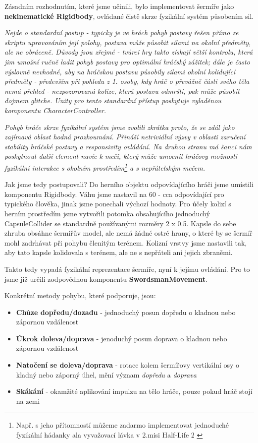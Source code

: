 Zásadním rozhodnutím, které jsme učinili, bylo implementovat šermíře jako \textbf{nekinematické Rigidbody}, ovládané čistě skrze fyzikální systém působením sil. 

\textit{Nejde o standardní postup - typicky je ve hrách pohyb postavy řešen přímo ze skriptu upravováním její polohy, postava může působit silami na okolní předměty, ale ne obráceně. Důvody jsou zřejmé - tvůrci hry takto získají větší kontrolu, která jim umožní ručně ladit pohyb postavy pro optimální hráčský zážitek; dále je často výslovně nevhodné, aby na hráčskou postavu působily silami okolní kolidující předměty - především při pohledu z 1. osoby, kdy hráč o převážně části svého těla nemá přehled - nezpozorovaná kolize, která postavu odmrští, pak může působit dojmem glitche. Unity pro tento standardní přístup poskytuje vyladěnou komponentu CharacterController.}

\textit{Pohyb hráče skrze fyzikální systém jsme zvolili zkrátka proto, že se zdál jako zajímavá oblast hodná prozkoumání. Přináší netriviální výzvy v oblasti zaručení stability hráčské postavy a responsivity ovládání. Na druhou stranu má šanci nám poskytnout další element navíc k meči, který může umocnit hráčovy možnosti fyzikální interakce s okolním prostředím\footnote{Např. s jeho přítomností můžeme zadarmo implementovat jednoduché fyzikální hádanky ala vyvažovací lávka v 2.misi Half-Life 2 \cite{HalfLife2}} a s nepřátelským mečem.}

Jak jsme tedy postupovali? Do herního objektu odpovídajícího hráči jsme umístili komponentu Rigidbody. Váhu jsme nastavil na 60 - cca odpovídající pro typického člověka, jinak jsme ponechali výchozí hodnoty. Pro účely kolizí s herním prostředím jsme vytvořili potomka obsahujícího jednoduchý CapsuleCollider se standardně používanými rozměry 2 x 0.5. Kapsle do sebe zhruba obsáhne šermířův model, ale nemá žádné ostré hrany, o které by se šermíř mohl zadrhávat při pohybu členitým terénem. Kolizní vrstvy jsme nastavili tak, aby tato kapsle kolidovala s terénem, ale ne s nepřáteli ani jejich zbraněmi.

Takto tedy vypadá fyzikální reprezentace šermíře, nyní k jejímu ovládání. Pro to jsme již určili zodpovědnou komponentu \textbf{SwordsmanMovement}. 

Konkrétní metody pohybu, které podporuje, jsou:
\begin{itemize}
  \item \textbf{Chůze dopředu/dozadu} - jednoduchý posun dopředu o kladnou nebo zápornou vzdálenost
  \item \textbf{Úkrok doleva/doprava} - jenoduchý posun doprava o kladnou nebo zápornou vzdálenost
  \item \textbf{Natočení se doleva/doprava} - rotace kolem šermířovy vertikální osy o kladný nebo záporný úhel, mění význam \textit{dopředu} a \textit{doprava}
  \item \textbf{Skákání} - okamžité aplikování impulzu na tělo hráče, pouze pokud hráč stojí na zemi
\end{itemize}

